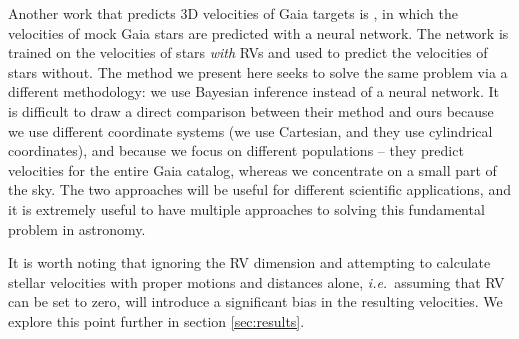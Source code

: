 \documentclass[]{aastex631}
\newcommand{\ie}{{\it i.e.}}
\newcommand{\kepler}{{Kepler}}
\newcommand{\vx}{$v_{\bf x}$}
\newcommand{\vy}{$v_{\bf y}$}
\newcommand{\vz}{$v_{\bf z}$}
\newcommand{\vb}{$v_{\bf b}$}
\begin{document}
Another work that predicts 3D velocities of Gaia targets is
\citet{dropulic2021}, in which the velocities of mock Gaia stars are predicted
with a neural network.
The network is trained on the velocities of stars {\it with} RVs and used to
predict the velocities of stars without.
The method we present here seeks to solve the same problem via a different
methodology: we use Bayesian inference instead of a neural network.
It is difficult to draw a direct comparison between their method and ours
because we use different coordinate systems (we use Cartesian, and they use
cylindrical coordinates), and because we focus on different populations --
they predict velocities for the entire Gaia catalog, whereas we concentrate on
a small part of the sky.
The two approaches will be useful for different scientific applications, and
it is extremely useful to have multiple approaches to solving this fundamental
problem in astronomy.

It is worth noting that ignoring the RV dimension and attempting to
calculate stellar velocities with proper motions and distances alone, \ie\
assuming that RV can be set to zero, will introduce a significant bias in the
resulting velocities.
We explore this point further in section \ref{sec:results}.

\end{document}
